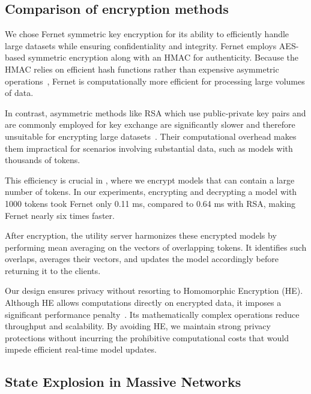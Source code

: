 \subsection*{Comparison of encryption methods}
\label{sec:encrypt}

We chose Fernet symmetric key encryption for its ability to efficiently handle large datasets while ensuring confidentiality and integrity. Fernet employs AES-based symmetric encryption along with an HMAC for authenticity. Because the HMAC relies on efficient hash functions rather than expensive asymmetric operations~\cite{raj2023performance}, Fernet is computationally more efficient for processing large volumes of data.

In contrast, asymmetric methods like RSA which use public-private key pairs and are commonly employed for key exchange are significantly slower and therefore unsuitable for encrypting large datasets~\cite{menezes2018handbook}. Their computational overhead makes them impractical for scenarios involving substantial data, such as \wordvec models with thousands of tokens.

This efficiency is crucial in \Sys, where we encrypt \wordvec models that can contain a large number of tokens. In our experiments, encrypting and decrypting a \wordvec model with 1000 tokens took Fernet only 0.11 ms, compared to 0.64 ms with RSA, making Fernet nearly six times faster.

After encryption, the utility server harmonizes these encrypted models by performing mean averaging on the vectors of overlapping tokens. It identifies such overlaps, averages their vectors, and updates the model accordingly before returning it to the clients.

Our design ensures privacy without resorting to Homomorphic Encryption (HE). Although HE allows computations directly on encrypted data, it imposes a significant performance penalty~\cite{naehrig2011can}. Its mathematically complex operations reduce throughput and scalability. By avoiding HE, we maintain strong privacy protections without incurring the prohibitive computational costs that would impede efficient real-time model updates.

\subsection*{State Explosion in Massive Networks}
\label{state:explosion}

